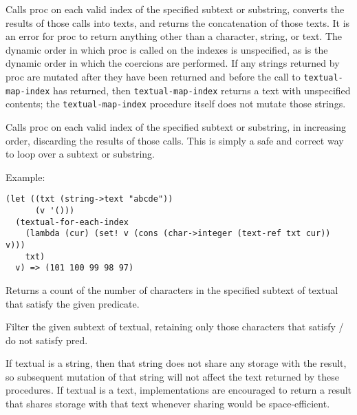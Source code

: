 \begin{entry}{%
  }

  Calls proc on each valid index of the specified subtext or
  substring, converts the results of those calls into texts, and
  returns the concatenation of those texts. It is an error for proc to
  return anything other than a character, string, or text. The dynamic
  order in which proc is called on the indexes is unspecified, as is
  the dynamic order in which the coercions are performed. If any
  strings returned by proc are mutated after they have been returned
  and before the call to \texttt{textual-map-index} has returned, then
  \texttt{textual-map-index} returns a text with unspecified contents;
  the \texttt{textual-map-index} procedure itself does not mutate
  those strings.
\end{entry}

\begin{entry}{%
  }

  Calls proc on each valid index of the
  specified subtext or substring, in increasing order, discarding the
  results of those calls. This is simply a safe and correct way to
  loop over a subtext or substring.

  Example:

\begin{verbatim}
(let ((txt (string->text "abcde"))
      (v '()))
  (textual-for-each-index
    (lambda (cur) (set! v (cons (char->integer (text-ref txt cur)) v)))
    txt)
  v) => (101 100 99 98 97)
\end{verbatim}
\end{entry}

\begin{entry}{%
  }

  Returns a count of the number of characters in the
  specified subtext of textual that satisfy the given predicate.
\end{entry}

\begin{entry}{%
  }
  
  Filter the given subtext of textual, retaining only those characters
  that satisfy / do not satisfy pred.

  If textual is a string, then that string does not share any storage
  with the result, so subsequent mutation of that string will not
  affect the text returned by these procedures. If textual is a text,
  implementations are encouraged to return a result that shares
  storage with that text whenever sharing would be space-efficient.
\end{entry}

